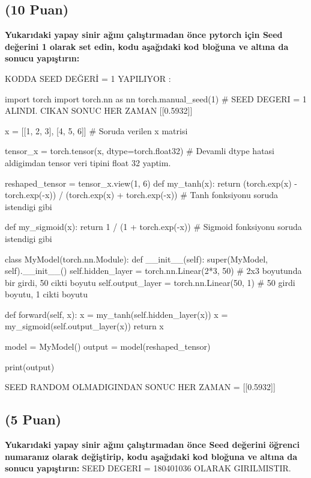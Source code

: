 \documentclass[11pt]{article}
\begin{document}
\subsection{(10 Puan)} \textbf{Yukarıdaki yapay sinir ağını çalıştırmadan önce pytorch için Seed değerini 1 olarak set edin, kodu aşağıdaki kod bloğuna ve altına da sonucu yapıştırın:}

KODDA SEED DEĞERİ = 1 YAPILIYOR : 
\begin{python}

import torch
import torch.nn as nn
torch.manual_seed(1)    # SEED DEGERI = 1 ALINDI. CIKAN SONUC HER ZAMAN [[0.5932]]

x = [[1, 2, 3], [4, 5, 6]]                      # Soruda verilen x matrisi

tensor_x = torch.tensor(x, dtype=torch.float32) # Devamli dtype hatasi aldigimdan tensor veri tipini float 32 yaptim.

reshaped_tensor = tensor_x.view(1, 6)           
def my_tanh(x):
    return (torch.exp(x) - torch.exp(-x)) / (torch.exp(x) + torch.exp(-x))     # Tanh fonksiyonu soruda istendigi gibi 

def my_sigmoid(x):
    return 1 / (1 + torch.exp(-x))                                             # Sigmoid fonksiyonu soruda istendigi gibi

class MyModel(torch.nn.Module):
    def __init__(self):
        super(MyModel, self).__init__()
        self.hidden_layer = torch.nn.Linear(2*3, 50)  # 2x3 boyutunda bir girdi, 50 cikti boyutu
        self.output_layer = torch.nn.Linear(50, 1)  # 50 girdi boyutu, 1 cikti boyutu



    def forward(self, x):
        x = my_tanh(self.hidden_layer(x))
        x = my_sigmoid(self.output_layer(x))
        return x

model = MyModel()
output = model(reshaped_tensor) 

print(output)
\end{python}

SEED RANDOM OLMADIGINDAN SONUC HER ZAMAN = [[0.5932]]


\newpage

\subsection{(5 Puan)} \textbf{Yukarıdaki yapay sinir ağını çalıştırmadan önce Seed değerini öğrenci numaranız olarak değiştirip, kodu aşağıdaki kod bloğuna ve altına da sonucu yapıştırın:}
SEED DEGERI = 180401036 OLARAK GIRILMISTIR.
\end{document}
